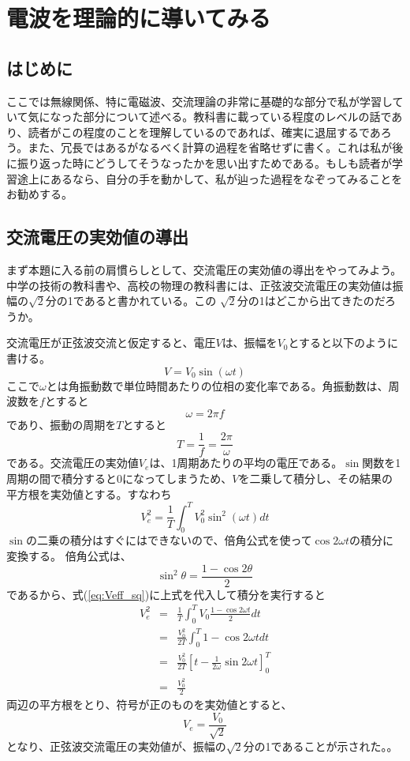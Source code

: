 \chapter*{電波を理論的に導いてみる}
\section*{はじめに}


ここでは無線関係、特に電磁波、交流理論の非常に基礎的な部分で私が学習していて気になった部分について述べる。教科書に載っている程度のレベルの話であり、読者がこの程度のことを理解しているのであれば、確実に退屈するであろう。また、冗長ではあるがなるべく計算の過程を省略せずに書く。これは私が後に振り返った時にどうしてそうなったかを思い出すためである。もしも読者が学習途上にあるなら、自分の手を動かして、私が辿った過程をなぞってみることをお勧めする。

\section*{交流電圧の実効値の導出}
まず本題に入る前の肩慣らしとして、交流電圧の実効値の導出をやってみよう。
中学の技術の教科書や、高校の物理の教科書には、正弦波交流電圧の実効値は振幅の$\sqrt{2}$分の1であると書かれている。この
$\sqrt{2}$分の1はどこから出てきたのだろうか。

交流電圧が正弦波交流と仮定すると、電圧$V$は、振幅を$V_0$とすると以下のように書ける。
\begin{equation}
V=V_0 \sin(\omega t) \label{eq:defv}
\end{equation}
ここで$\omega$とは角振動数で単位時間あたりの位相の変化率である。角振動数は、周波数を$f$とすると
\[
\omega = 2 \pi f
\]
であり、振動の周期を$T$とすると
\[
T = \frac{1}{f} = \frac{2 \pi}{\omega}
\]
である。交流電圧の実効値$V_e$は、1周期あたりの平均の電圧である。$\sin$関数を1周期の間で積分すると$0$になってしまうため、$V$を二乗して積分し、その結果の平方根を実効値とする。すなわち
\begin{equation}
V_e^2 =\frac{1}{T} \int_{0}^{T}V_0^2\sin^2(\omega t)dt \label{eq:Veff_sq}
\end{equation}
$\sin$の二乗の積分はすぐにはできないので、倍角公式を使って$\cos 2\omega t$の積分に変換する。
倍角公式は、
\[
\sin^2\theta = \frac{1-\cos 2\theta}{2}
\]
であるから、式(\ref{eq:Veff_sq})に上式を代入して積分を実行すると
\begin{eqnarray*}
V_e^2 &=& \frac{1}{T}\int_{0}^{T} V_0 \frac{1-\cos 2\omega t}{2} dt \\
&=& \frac{V_0^2}{2T}\int_0^{T} 1 - \cos 2\omega t dt \\
&=& \frac{V_0^2}{2T}[t - \frac{1}{2 \omega}\sin 2\omega t ]_0^{T} \\
&=& \frac{V_0^2}{2}
\end{eqnarray*}
両辺の平方根をとり、符号が正のものを実効値とすると、
\[
V_e = \frac{V_0}{\sqrt{2}}
\]
となり、正弦波交流電圧の実効値が、振幅の$\sqrt{2}$分の1であることが示された。。

